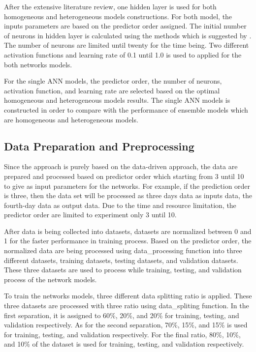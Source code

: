 After the extensive literature review, one hidden layer is used for both homogeneous and heterogeneous models constructions. For both model, the inputs parameters are based on the predictor order assigned. The initial number of neurons in hidden layer is calculated using the methods which is suggested by . The number of neurons are limited until twenty for the time being. Two different activation functions and learning rate of 0.1 until 1.0 is used to applied for the both networks models.

For the single ANN models, the predictor order, the number of neurons, activation function, and learning rate are selected based on the optimal homogeneous and heterogeneous models results. The single ANN models is constructed in order to compare  with the performance of ensemble models which are homogeneous and heterogeneous models.

\subsection{Data Preparation and Preprocessing}
Since the approach is purely based on the data-driven approach, the data are prepared and processed based on predictor order which starting from 3 until 10 to give as input parameters for the networks. For example, if the prediction order is three, then the data set will be processed as three days data as inputs data, the fourth-day data as output data. Due to the time and resource limitation, the predictor order  are limited to experiment only 3 until 10. 

After data is being collected into datasets, datasets are normalized between 0 and 1 for the faster performance in training process. Based on the predictor order, the normalized data are being processed using data\_processing function into three different datasets, training datasets, testing datasets, and validation datasets. These three datasets are used to process while training, testing, and validation process of the network models.

To train the networks models, three different data splitting ratio is applied. These three datasets are processed with three ratio using data\_spliting function. In the first separation, it is assigned to 60\%, 20\%, and 20\% for training, testing, and validation respectively. As for the second separation, 70\%, 15\%, and 15\% is used for  training, testing, and validation respectively. For the final ratio, 80\%, 10\%, and 10\% of the dataset is used for  training, testing, and validation respectively.

